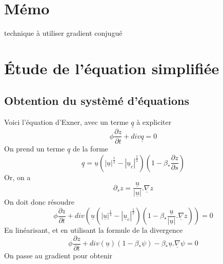\documentclass[a4paper,10pt]{article}
\title{}
\author{Arnaud Paran}
\begin{document}
\makeatletter
\newcommand*{\bdiv}{%
  \nonscript\mskip-\medmuskip\mkern5mu%
  \mathbin{\operator@font div}\penalty900\mkern5mu%
  \nonscript\mskip-\medmuskip
}
\makeatother
  

  \maketitle

  \begin{abstract}

  \end{abstract}

  \section{Mémo}
  technique à utiliser gradient conjugué

  \section{Étude de l'équation simplifiée}
      
  \subsection{Obtention du systèmé d'équations}
  Voici l'équation d'Exner, avec un terme $\underline{q}$ à expliciter
  \begin{equation}\label{eq}
    \phi\frac{\partial z}{\partial t}+div\underline{q}=0
  \end{equation}
  On prend un terme $\underline{q}$ de la forme
  \begin{equation}
    \underline{q}=\underline{u}(|\underline{u}|^{\frac{1}{2}}-|\underline{u}_c|^{\frac{1}{2}})(1-\beta_*\frac{\partial z}{\partial s})
  \end{equation}
  Or, on a 
  \[\partial_sz=\frac{\underline{u}}{|\underline{u}|}.\underline\nabla z\]
  On doit donc résoudre
  \[\phi\frac{\partial z}{\partial t}+div(\underline{u}(|\underline{u}|^{\frac{1}{2}}-|\underline{u}_c|^{\frac{1}{2}})(1-\beta_*\frac{\underline{u}}{|\underline{u}|}.\underline\nabla z))=0\]
  En linéarisant, et en utilisant la formule de la divergence
  \[\phi\frac{\partial z}{\partial t}+div(\underline{u})(1-\beta_*\psi)-\beta_*\underline{u}.\underline{\nabla}\psi=0\]
  On passe au gradient pour obtenir
  
\end{document}
